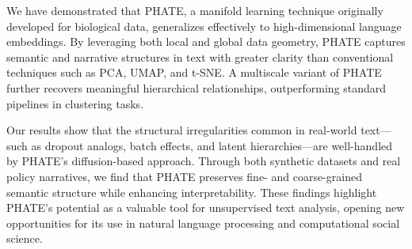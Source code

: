 We have demonstrated that PHATE, a manifold learning technique originally developed for biological data, generalizes effectively to high-dimensional language embeddings. By leveraging both local and global data geometry, PHATE captures semantic and narrative structures in text with greater clarity than conventional techniques such as PCA, UMAP, and t-SNE. A multiscale variant of PHATE further recovers meaningful hierarchical relationships, outperforming standard pipelines in clustering tasks.

Our results show that the structural irregularities common in real-world text—such as dropout analogs, batch effects, and latent hierarchies—are well-handled by PHATE’s diffusion-based approach. Through both synthetic datasets and real policy narratives, we find that PHATE preserves fine- and coarse-grained semantic structure while enhancing interpretability. These findings highlight PHATE’s potential as a valuable tool for unsupervised text analysis, opening new opportunities for its use in natural language processing and computational social science.